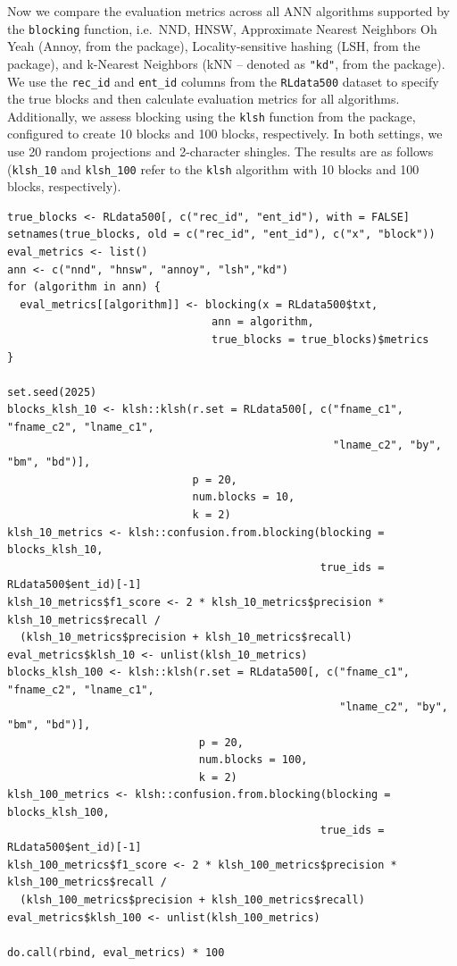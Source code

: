 Now we compare the evaluation metrics across all ANN algorithms supported by the \texttt{blocking} function, i.e.~NND, HNSW, Approximate Nearest Neighbors Oh Yeah (Annoy, from the  package), Locality-sensitive hashing (LSH, from the  package), and k-Nearest Neighbors (kNN -- denoted as \texttt{"kd"}, from the  package). We use the \texttt{rec\_id} and \texttt{ent\_id} columns from the \texttt{RLdata500} dataset to specify the true blocks and then calculate evaluation metrics for all algorithms. Additionally, we assess blocking using the \texttt{klsh} function from the  package, configured to create 10 blocks and 100 blocks, respectively. In both settings, we use 20 random projections and 2-character shingles. The results are as follows (\texttt{klsh\_10} and \texttt{klsh\_100} refer to the \texttt{klsh} algorithm with 10 blocks and 100 blocks, respectively).

\begin{verbatim}
true_blocks <- RLdata500[, c("rec_id", "ent_id"), with = FALSE]
setnames(true_blocks, old = c("rec_id", "ent_id"), c("x", "block"))
eval_metrics <- list()
ann <- c("nnd", "hnsw", "annoy", "lsh","kd")
for (algorithm in ann) {
  eval_metrics[[algorithm]] <- blocking(x = RLdata500$txt,
                                ann = algorithm,
                                true_blocks = true_blocks)$metrics
}

set.seed(2025)
blocks_klsh_10 <- klsh::klsh(r.set = RLdata500[, c("fname_c1", "fname_c2", "lname_c1",
                                                   "lname_c2", "by", "bm", "bd")],
                             p = 20,
                             num.blocks = 10,
                             k = 2)
klsh_10_metrics <- klsh::confusion.from.blocking(blocking = blocks_klsh_10, 
                                                 true_ids = RLdata500$ent_id)[-1]
klsh_10_metrics$f1_score <- 2 * klsh_10_metrics$precision * klsh_10_metrics$recall / 
  (klsh_10_metrics$precision + klsh_10_metrics$recall)
eval_metrics$klsh_10 <- unlist(klsh_10_metrics)
blocks_klsh_100 <- klsh::klsh(r.set = RLdata500[, c("fname_c1", "fname_c2", "lname_c1",
                                                    "lname_c2", "by", "bm", "bd")],
                              p = 20,
                              num.blocks = 100,
                              k = 2)
klsh_100_metrics <- klsh::confusion.from.blocking(blocking = blocks_klsh_100, 
                                                 true_ids = RLdata500$ent_id)[-1]
klsh_100_metrics$f1_score <- 2 * klsh_100_metrics$precision * klsh_100_metrics$recall /
  (klsh_100_metrics$precision + klsh_100_metrics$recall)
eval_metrics$klsh_100 <- unlist(klsh_100_metrics)

do.call(rbind, eval_metrics) * 100
\end{verbatim}

